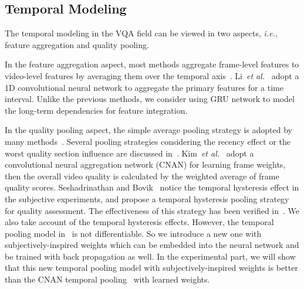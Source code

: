 \documentclass[sigconf]{acmart}
\begin{document}
\subsection{Temporal Modeling}

The temporal modeling in the VQA field can be viewed in two aspects, \textit{i.e.}, feature aggregation and quality pooling. 

In the feature aggregation aspect, most methods aggregate frame-level features to video-level features by averaging them over the temporal axis~\cite{men2017empirical, saad2014blind, manasa2016optical-NR,men2018spatiotemporal, freitas2018using,li2016spatiotemporal}. 
Li~\textit{et al.}~\cite{li2016no} adopt a 1D convolutional neural network to aggregate the primary features for a time interval. 
Unlike the previous methods, we consider using GRU network to model the long-term dependencies for feature integration.

In the quality pooling aspect, the simple average pooling strategy is adopted by many methods~\cite{vu2014vis3,seshadrinathan2010motion, liu2018end, zhu2017blind,mittal2016completely}. 
Several pooling strategies considering the recency effect or the worst quality section influence are discussed in~\cite{rimac2009influence,seufert2013pool}.
Kim~\textit{et al.}~\cite{kim2018deep} adopt a convolutional neural aggregation network (CNAN) for learning frame weights, then the overall video quality is calculated by the weighted average of frame quality scores. 
Seshadrinathan and Bovik~\cite{seshadrinathan2011temporal} notice the temporal hysteresis effect in the subjective experiments, and propose a temporal hysteresis pooling strategy for quality assessment. 
The effectiveness of this strategy has been verified in~\cite{seshadrinathan2011temporal, xu2014no, choi2018video}. 
We also take account of the temporal hysteresis effects. 
However, the temporal pooling model in~\cite{seshadrinathan2011temporal} is not differentiable. 
So we introduce a new one with subjectively-inspired weights which can be embedded into the neural network and be trained with back propagation as well. 
In the experimental part, we will show that this new temporal pooling model with subjectively-inspired weights is better than the CNAN temporal pooling~\cite{kim2018deep} with learned weights.
\end{document}
